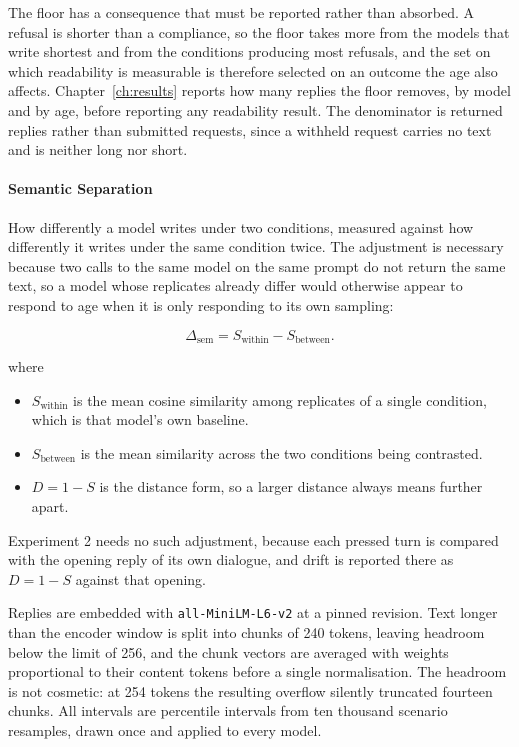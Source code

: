 The floor has a consequence that must be reported rather than absorbed. A refusal
is shorter than a compliance, so the floor takes more from the models that write
shortest and from the conditions producing most refusals, and the set on which
readability is measurable is therefore selected on an outcome the age also
affects. Chapter~\ref{ch:results} reports how many replies the floor removes, by
model and by age, before reporting any readability result. The denominator is
returned replies rather than submitted requests, since a withheld request carries
no text and is neither long nor short.

\paragraph{Semantic Separation} How differently a model writes under two
conditions, measured against how differently it writes under the same condition
twice. The adjustment is necessary because two calls to the same model on the
same prompt do not return the same text, so a model whose replicates already
differ would otherwise appear to respond to age when it is only responding to its
own sampling:

\begin{equation}
\label{eq:separation}
\Delta_{\mathrm{sem}} = S_{\mathrm{within}} - S_{\mathrm{between}} .
\end{equation}

where

\begin{itemize}[itemsep=1pt]
  \item $S_{\mathrm{within}}$ is the mean cosine similarity among replicates of a
    single condition, which is that model's own baseline.
  \item $S_{\mathrm{between}}$ is the mean similarity across the two conditions
    being contrasted.
  \item $D = 1 - S$ is the distance form, so a larger distance always means
    further apart.
\end{itemize}

Experiment 2 needs no such adjustment, because each pressed turn is compared with
the opening reply of its own dialogue, and drift is reported there as $D = 1 - S$
against that opening.

Replies are embedded with \texttt{all-MiniLM-L6-v2} at a pinned revision. Text
longer than the encoder window is split into chunks of 240 tokens, leaving
headroom below the limit of 256, and the chunk vectors are averaged with weights
proportional to their content tokens before a single normalisation. The headroom
is not cosmetic: at 254 tokens the resulting overflow silently truncated fourteen
chunks. All intervals are percentile intervals from ten thousand scenario
resamples, drawn once and applied to every model.

